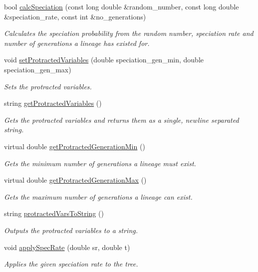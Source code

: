 \begin{DoxyCompactItemize}
\item 
bool \hyperlink{class_protracted_tree_ad4a23e4ddf54b374c6620f23f18cff27}{calc\+Speciation} (const long double \&random\+\_\+number, const long double \&speciation\+\_\+rate, const int \&no\+\_\+generations)
\begin{DoxyCompactList}\small\item\em Calculates the speciation probability from the random number, speciation rate and number of generations a lineage has existed for. \end{DoxyCompactList}\item 
void \hyperlink{class_protracted_tree_a62128de5d5a6ed0dafc0492ec4ea27b7}{set\+Protracted\+Variables} (double speciation\+\_\+gen\+\_\+min, double speciation\+\_\+gen\+\_\+max)
\begin{DoxyCompactList}\small\item\em Sets the protracted variables. \end{DoxyCompactList}\item 
string \hyperlink{class_protracted_tree_a5558d12d0595e3789a317c9eb9d88f5f}{get\+Protracted\+Variables} ()
\begin{DoxyCompactList}\small\item\em Gets the protracted variables and returns them as a single, newline separated string. \end{DoxyCompactList}\item 
virtual double \hyperlink{class_protracted_tree_a93f2dc40d4539703e56282f5aacd0e23}{get\+Protracted\+Generation\+Min} ()
\begin{DoxyCompactList}\small\item\em Gets the minimum number of generations a lineage must exist. \end{DoxyCompactList}\item 
virtual double \hyperlink{class_protracted_tree_a705f8141d382c336d5b237d446cbe945}{get\+Protracted\+Generation\+Max} ()
\begin{DoxyCompactList}\small\item\em Gets the maximum number of generations a lineage can exist. \end{DoxyCompactList}\item 
string \hyperlink{class_protracted_tree_a0a899dcd433a3f8e752fa02640f561c0}{protracted\+Vars\+To\+String} ()
\begin{DoxyCompactList}\small\item\em Outputs the protracted variables to a string. \end{DoxyCompactList}\item 
void \hyperlink{class_protracted_tree_a56a3631e65bb91d04ba4626c4c1ea79a}{apply\+Spec\+Rate} (double sr, double t)
\begin{DoxyCompactList}\small\item\em Applies the given speciation rate to the tree. \end{DoxyCompactList}\end{DoxyCompactItemize}
